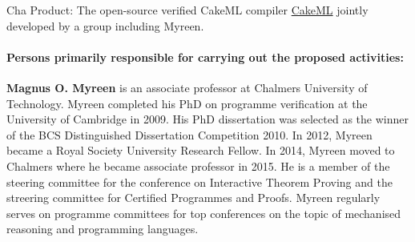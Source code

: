 \begin{sitedescription}{Cha}
Product: The open-source verified CakeML compiler \href{https://cakeml.org/}{CakeML}
jointly developed by a group including Myreen.

\paragraph*{Persons primarily responsible for carrying out the proposed activities:}

\begin{compactitem}
\item \textbf{Magnus O. Myreen} is an associate professor at Chalmers
  University of Technology.  Myreen completed his PhD on programme
  verification at the University of Cambridge in 2009. His PhD
  dissertation was selected as the winner of the BCS Distinguished
  Dissertation Competition 2010. In 2012, Myreen became a Royal
  Society University Research Fellow. In 2014, Myreen moved to
  Chalmers where he became associate professor in 2015.  He is a
  member of the steering committee for the conference on Interactive
  Theorem Proving and the streering committee for Certified Programmes
  and Proofs.  Myreen regularly serves on programme committees for top
  conferences on the topic of mechanised reasoning and programming
  languages.
\end{compactitem}

\end{sitedescription}

